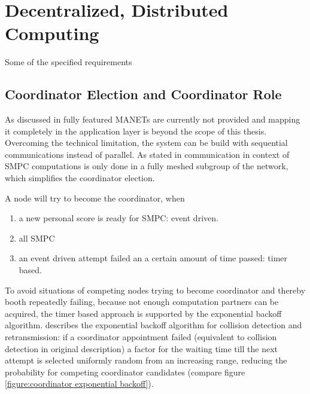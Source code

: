 	\FloatBarrier
	\section{Decentralized, Distributed Computing}
	\label{Decentralized, Distributed Computing}
	
		Some of the specified requirements 

		\subsection{Coordinator Election and Coordinator Role}
		\label{Coordinator Election}
		
		As discussed in  fully featured \gls{MANET}s are currently not provided and mapping it completely in the application layer is beyond the scope of this thesis. Overcoming the technical limitation, the system can be build with sequential communications instead of parallel. As stated in  communication in context of \gls{SMPC} computations is only done in a fully meshed subgroup of the network, which simplifies the coordinator election.
		
		\noindent A node will try to become the coordinator, when \nolinebreak
		\begin{enumerate}
			\item a new personal score is ready for \gls{SMPC}: event driven.
			\item all \gls{SMPC}
			\item an event driven attempt failed an a certain amount of time passed: timer based.
		\end{enumerate}
		
		To avoid situations of competing nodes trying to become coordinator and thereby booth repeatedly failing, because not enough computation partners can be acquired, the timer based approach is supported by the exponential backoff algorithm. \textcite[p.67]{IEEE2010} describes the exponential backoff algorithm for collision detection and retransmission: if a coordinator appointment failed (equivalent to collision detection in original description) a factor for the waiting time till the next attempt is selected uniformly random from an increasing range, reducing the probability for competing coordinator candidates (compare figure \ref{figure:coordinator exponential backoff}).
		
